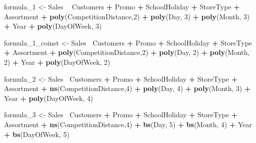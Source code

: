 \documentclass[]{article}
\newenvironment{Shaded}{\begin{snugshade}}{\end{snugshade}}
\newcommand{\DecValTok}[1]{\textcolor[rgb]{0.00,0.00,0.81}{#1}}
\newcommand{\KeywordTok}[1]{\textcolor[rgb]{0.13,0.29,0.53}{\textbf{#1}}}
\newcommand{\NormalTok}[1]{#1}
\newcommand{\OperatorTok}[1]{\textcolor[rgb]{0.81,0.36,0.00}{\textbf{#1}}}
\newcommand{\StringTok}[1]{\textcolor[rgb]{0.31,0.60,0.02}{#1}}
\begin{document}
\begin{Shaded}
\begin{Highlighting}[]
\NormalTok{formula_}\DecValTok{1}\NormalTok{ <-}\StringTok{ }\NormalTok{Sales }\OperatorTok{~}\StringTok{ }\NormalTok{Customers }\OperatorTok{+}\StringTok{ }\NormalTok{Promo }\OperatorTok{+}\StringTok{ }\NormalTok{SchoolHoliday }\OperatorTok{+}\StringTok{ }\NormalTok{StoreType }\OperatorTok{+}\StringTok{ }\NormalTok{Assortment }\OperatorTok{+}\StringTok{ }\KeywordTok{poly}\NormalTok{(CompetitionDistance,}\DecValTok{2}\NormalTok{) }\OperatorTok{+}\StringTok{ }\KeywordTok{poly}\NormalTok{(Day, }\DecValTok{3}\NormalTok{) }\OperatorTok{+}\StringTok{ }\KeywordTok{poly}\NormalTok{(Month, }\DecValTok{3}\NormalTok{) }\OperatorTok{+}\StringTok{ }\NormalTok{Year }\OperatorTok{+}\StringTok{ }\KeywordTok{poly}\NormalTok{(DayOfWeek, }\DecValTok{3}\NormalTok{)}

\NormalTok{formula_}\DecValTok{1}\NormalTok{_coinst <-}\StringTok{ }\NormalTok{Sales}\OperatorTok{~}\StringTok{ }\NormalTok{Customers }\OperatorTok{+}\StringTok{ }\NormalTok{Promo }\OperatorTok{+}\StringTok{ }\NormalTok{SchoolHoliday }\OperatorTok{+}\StringTok{ }\NormalTok{StoreType }\OperatorTok{+}\StringTok{ }\NormalTok{Assortment }\OperatorTok{+}\StringTok{ }\KeywordTok{poly}\NormalTok{(CompetitionDistance,}\DecValTok{2}\NormalTok{) }\OperatorTok{+}\StringTok{ }\KeywordTok{poly}\NormalTok{(Day, }\DecValTok{2}\NormalTok{) }\OperatorTok{+}\StringTok{ }\KeywordTok{poly}\NormalTok{(Month, }\DecValTok{2}\NormalTok{) }\OperatorTok{+}\StringTok{ }\NormalTok{Year }\OperatorTok{+}\StringTok{ }\KeywordTok{poly}\NormalTok{(DayOfWeek, }\DecValTok{2}\NormalTok{)}

\NormalTok{formula_}\DecValTok{2}\NormalTok{ <-}\StringTok{ }\NormalTok{Sales}\OperatorTok{~}\StringTok{ }\NormalTok{Customers }\OperatorTok{+}\StringTok{ }\NormalTok{Promo }\OperatorTok{+}\StringTok{ }\NormalTok{SchoolHoliday }\OperatorTok{+}\StringTok{ }\NormalTok{StoreType }\OperatorTok{+}\StringTok{ }\NormalTok{Assortment }\OperatorTok{+}\StringTok{ }\KeywordTok{ns}\NormalTok{(CompetitionDistance,}\DecValTok{4}\NormalTok{) }\OperatorTok{+}\StringTok{ }\KeywordTok{poly}\NormalTok{(Day, }\DecValTok{4}\NormalTok{) }\OperatorTok{+}\StringTok{ }\KeywordTok{poly}\NormalTok{(Month, }\DecValTok{3}\NormalTok{) }\OperatorTok{+}\StringTok{ }\NormalTok{Year }\OperatorTok{+}\StringTok{ }\KeywordTok{poly}\NormalTok{(DayOfWeek, }\DecValTok{4}\NormalTok{)}

\NormalTok{formula_}\DecValTok{3}\NormalTok{ <-}\StringTok{ }\NormalTok{Sales}\OperatorTok{~}\StringTok{ }\NormalTok{Customers }\OperatorTok{+}\StringTok{ }\NormalTok{Promo }\OperatorTok{+}\StringTok{ }\NormalTok{SchoolHoliday }\OperatorTok{+}\StringTok{ }\NormalTok{StoreType }\OperatorTok{+}\StringTok{ }\NormalTok{Assortment }\OperatorTok{+}\StringTok{ }\KeywordTok{ns}\NormalTok{(CompetitionDistance,}\DecValTok{4}\NormalTok{) }\OperatorTok{+}\StringTok{ }\KeywordTok{bs}\NormalTok{(Day, }\DecValTok{5}\NormalTok{) }\OperatorTok{+}\StringTok{ }\KeywordTok{bs}\NormalTok{(Month, }\DecValTok{4}\NormalTok{) }\OperatorTok{+}\StringTok{ }\NormalTok{Year }\OperatorTok{+}\StringTok{ }\KeywordTok{bs}\NormalTok{(DayOfWeek, }\DecValTok{5}\NormalTok{)}


\end{Highlighting}
\end{Shaded}
\end{document}
